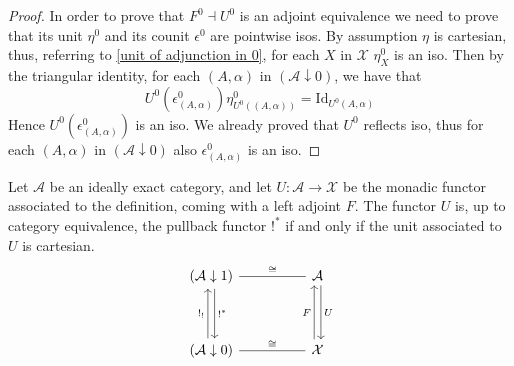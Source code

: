 \begin{subbox}{}
\begin{proof}
        In order to prove that $F^0 \dashv U^0$ is an adjoint equivalence we need to prove that its unit $\eta^0$ and its counit $\epsilon^0$ are pointwise isos. By assumption $\eta$ is cartesian, thus, referring to \eqref{unit of adjunction in 0}, for each $X$ in $\mathcal{X}$ $\eta^0_X$ is an iso. Then by the triangular identity, for each $(A,\alpha)$ in $(\mathcal{A} \downarrow 0)$, we have that
        \[
        U^0(\epsilon^0_{(A,\alpha)}) \eta^0_{U^0((A,\alpha))} =\mathrm{Id}_{U^0(A,\alpha)}
        \]
        Hence $U^0(\epsilon^0_{(A,\alpha)})$ is an iso. We already proved that $U^0$ reflects iso, thus for each $(A,\alpha)$ in $(\mathcal{A} \downarrow 0)$ also $\epsilon^0_{(A,\alpha)}$ is an iso.
    \end{proof}
\end{subbox}

\begin{mainbox}{}
\begin{theo}\label{U is !^* up to iso iff unit is cartesian}
Let $\mathcal{A}$ be an ideally exact category, and let $U:\mathcal{A} \to \mathcal{X}$ be the monadic functor associated to the definition, coming with a left adjoint $F$. The functor $U$ is, up to category equivalence, the pullback functor $!^*$ if and only if the unit associated to $U$ is cartesian.
\begin{equation}\label{U is !^* up to iso}
\begin{tikzcd}
(\mathcal{A} \downarrow 1) \arrow[rr, "\cong", no head] \arrow[dd, "!^*", shift left] &  & \mathcal{A} \arrow[dd, "U", shift left] \\
                                                                                      &  &                                         \\
(\mathcal{A} \downarrow 0) \arrow[rr, "\cong", no head] \arrow[uu, "!_!", shift left] &  & \mathcal{X} \arrow[uu, "F", shift left]
\end{tikzcd}
\end{equation}
\end{theo}
\end{mainbox}

